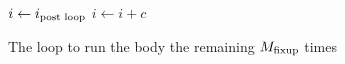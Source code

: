 \begin{figure}[H]
    \begin{algorithmic}
        \State $i \gets i_\text{post loop}$
            \State {}
            \State $i \gets i + c$
        \EndWhile
    \end{algorithmic}
    \caption{The loop to run the body the remaining $M_{\text{fixup}}$ times}
    \label{fig:impl:fixup:loop:fixup-loop}
\end{figure}